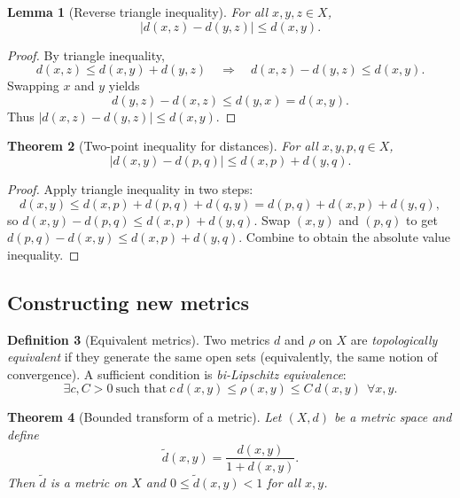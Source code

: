 \documentclass[11pt]{article}
\newtheorem{theorem}{Theorem}[section]
\newtheorem{lemma}[theorem]{Lemma}
\theoremstyle{definition}
\newtheorem{definition}[theorem]{Definition}
\begin{document}
\begin{lemma}[Reverse triangle inequality]
For all $x,y,z\in X$,
\[
|d(x,z)-d(y,z)|\le d(x,y).
\]
\end{lemma}

\begin{proof}
By triangle inequality,
\[
d(x,z)\le d(x,y)+d(y,z)\quad \Rightarrow \quad d(x,z)-d(y,z)\le d(x,y).
\]
Swapping $x$ and $y$ yields
\[
d(y,z)-d(x,z)\le d(y,x)=d(x,y).
\]
Thus $|d(x,z)-d(y,z)|\le d(x,y)$.
\end{proof}

\begin{theorem}[Two-point inequality for distances]
For all $x,y,p,q\in X$,
\[
|d(x,y)-d(p,q)|\le d(x,p)+d(y,q).
\]
\end{theorem}

\begin{proof}
Apply triangle inequality in two steps:
\[
d(x,y)\le d(x,p)+d(p,q)+d(q,y)=d(p,q)+d(x,p)+d(y,q),
\]
so $d(x,y)-d(p,q)\le d(x,p)+d(y,q)$.
Swap $(x,y)$ and $(p,q)$ to get $d(p,q)-d(x,y)\le d(x,p)+d(y,q)$.
Combine to obtain the absolute value inequality.
\end{proof}

\subsection{Constructing new metrics}

\begin{definition}[Equivalent metrics]
Two metrics $d$ and $\rho$ on $X$ are \emph{topologically equivalent} if they generate the same open sets (equivalently, the same notion of convergence).
A sufficient condition is \emph{bi-Lipschitz equivalence}:
\[
\exists c,C>0\ \text{such that}\ c\,d(x,y)\le \rho(x,y)\le C\,d(x,y)\ \ \forall x,y.
\]
\end{definition}

\begin{theorem}[Bounded transform of a metric]
Let $(X,d)$ be a metric space and define
\[
\tilde d(x,y)=\frac{d(x,y)}{1+d(x,y)}.
\]
Then $\tilde d$ is a metric on $X$ and $0\le \tilde d(x,y)<1$ for all $x,y$.
\end{theorem}
\end{document}

